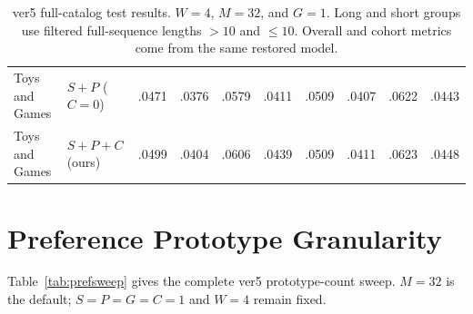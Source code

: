\documentclass[11pt]{article}
\begin{document}
\begin{table}[!t]
{\begin{tabular}{llrrrrrrrr}
Toys and Games & $S+P$ ($C=0$) & .0471 & .0376 & .0579 & .0411 & .0509 & .0407 & .0622 & .0443 \\
Toys and Games & $S+P+C$ (ours) & .0499 & .0404 & .0606 & .0439 & .0509 & .0411 & .0623 & .0448 \\
\bottomrule
\end{tabular}%
}
\caption{ver5 full-catalog test results. $W=4$, $M=32$, and $G=1$. Long and short groups use filtered full-sequence lengths $>10$ and $\leq10$. Overall and cohort metrics come from the same restored model.}
\label{tab:main_length_groups}
\end{table}

\section{Preference Prototype Granularity}
Table~\ref{tab:prefsweep} gives the complete ver5 prototype-count sweep. $M=32$ is the default; $S=P=G=C=1$ and $W=4$ remain fixed.
\end{document}
